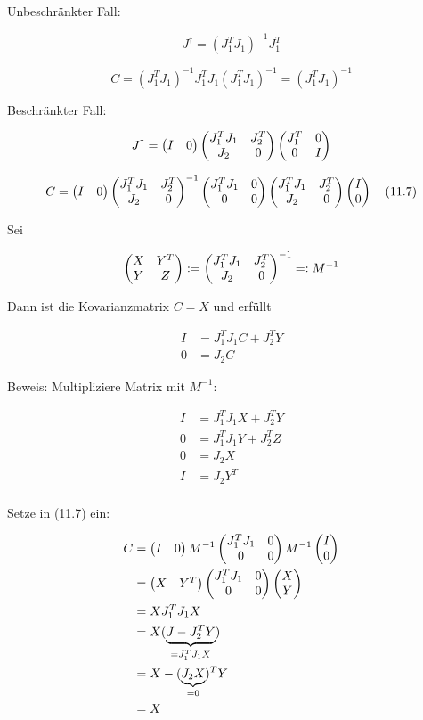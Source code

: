 Unbeschränkter Fall:

\[ J^\dagger = (J_1^T J_1)^{-1} J_1^T \]

\[ C = (J_1^T J_1)^{-1}J_1^T J_1 (J_1^T J_1)^{-1} = (J_1^T J_1)^{-1} \]

Beschränkter Fall:

\[ J^\dagger = \begin{pmatrix} I & 0 \end{pmatrix} \begin{pmatrix} J_1^T J_1 & J_2^T \\ J_2 & 0 \end{pmatrix} \begin{pmatrix} J_1^T & 0 \\ 0 & I \end{pmatrix} \]

\[ C = \begin{pmatrix} I & 0 \end{pmatrix} \begin{pmatrix} J_1^T J_1 & J_2^T \\ J_2 & 0 \end{pmatrix}^{-1} \begin{pmatrix} J_1^T J_1 & 0 \\ 0 & 0 \end{pmatrix} \begin{pmatrix} J_1^T J_1 & J_2^T \\ J_2 & 0 \end{pmatrix} \begin{pmatrix} I \\ 0 \end{pmatrix} \quad (11.7) \]


Sei

\[ \begin{pmatrix} X & Y^T \\ Y & Z \end{pmatrix} := \begin{pmatrix} J_1^T J_1 & J_2^T \\ J_2 & 0 \end{pmatrix}^{-1} =:M^{-1} \]

Dann ist die Kovarianzmatrix $C=X$ und erfüllt

\begin{align*}
I &= J_1^T J_1 C + J_2^T Y \\
0 &= J_2 C
\end{align*}

Beweis: Multipliziere Matrix mit $M^{-1}$:

\begin{align*}
I &= J_1^T J_1 X + J_2^T Y \\
0 &= J_1^T J_1 Y + J_2^T Z \\
0 &= J_2 X \\
I &= J_2 Y^T \\
\end{align*}

Setze in (11.7) ein:

\begin{align*}
C &= \begin{pmatrix} I & 0 \end{pmatrix} M^{-1} \begin{pmatrix} J_1^T J_1 & 0 \\ 0 & 0 \end{pmatrix} M^{-1} \begin{pmatrix} I \\ 0 \end{pmatrix} \\
&= \begin{pmatrix} X & Y^T \end{pmatrix} \begin{pmatrix} J_1^T J_1 & 0 \\ 0 & 0 \end{pmatrix} \begin{pmatrix} X \\ Y \end{pmatrix} \\
&= X J_1^T J_1 X\\
&= X (\underbrace{J - J_2^T Y}_{=J_1^T J_1 X}) \\
&= X - (\underbrace{J_2 X}_{=0})^T Y \\
&= X \\
\end{align*}


